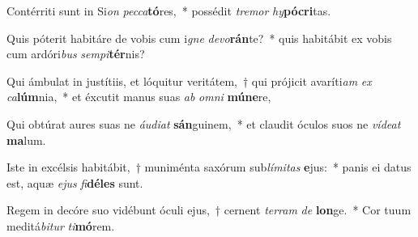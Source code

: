 \item Contérriti sunt in Si\textit{on} \textit{pec}\textit{ca}\textbf{tó}res,~* possédit \textit{tre}\textit{mor} \textit{hy}\textbf{pó}\textbf{cri}tas.
\item Quis póterit habitáre de vobis cum i\textit{gne} \textit{de}\textit{vo}\textbf{rán}te?~* quis habitábit ex vobis cum ardóri\textit{bus} \textit{sem}\textit{pi}\textbf{tér}nis?
\item Qui ámbulat in justítiis, et lóquitur veritátem,~† qui prójicit avaríti\textit{am} \textit{ex} \textit{ca}\textbf{lúm}nia,~* et éxcutit manus suas \textit{ab} \textit{om}\textit{ni} \textbf{mú}\textbf{ne}re,
\item Qui obtúrat aures suas ne \textit{áu}\textit{di}\textit{at} \textbf{sán}guinem,~* et claudit óculos suos ne \textit{ví}\textit{de}\textit{at} \textbf{ma}lum.
\item Iste in excélsis habitábit,~† muniménta saxórum sub\textit{lí}\textit{mi}\textit{tas} \textbf{e}jus:~* panis ei datus est, aquæ \textit{e}\textit{jus} \textit{fi}\textbf{dé}\textbf{les} sunt.
\item Regem in decóre suo vidébunt óculi ejus,~† cernent \textit{ter}\textit{ram} \textit{de} \textbf{lon}ge.~* Cor tuum meditá\textit{bi}\textit{tur} \textit{ti}\textbf{mó}rem.
